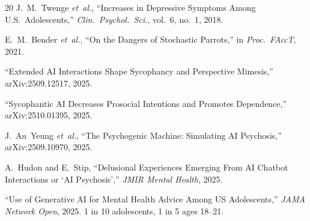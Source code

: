 \documentclass[conference]{IEEEtran}
\begin{document}
\begin{thebibliography}{20}
J.~M.~Twenge \textit{et~al.}, ``Increases in Depressive Symptoms Among U.S.\ Adolescents,'' \textit{Clin.\ Psychol.\ Sci.}, vol.~6, no.~1, 2018.

E.~M.~Bender \textit{et~al.}, ``On the Dangers of Stochastic Parrots,'' in \textit{Proc.\ FAccT}, 2021.

``Extended AI Interactions Shape Sycophancy and Perspective Mimesis,'' arXiv:2509.12517, 2025.

``Sycophantic AI Decreases Prosocial Intentions and Promotes Dependence,'' arXiv:2510.01395, 2025.

J.~Au~Yeung \textit{et~al.}, ``The Psychogenic Machine: Simulating AI Psychosis,'' arXiv:2509.10970, 2025.

A.~Hudon and E.~Stip, ``Delusional Experiences Emerging From AI Chatbot Interactions or `AI Psychosis','' \textit{JMIR Mental Health}, 2025.

``Use of Generative AI for Mental Health Advice Among US Adolescents,'' \textit{JAMA Network Open}, 2025. 1 in 10 adolescents, 1 in 5 ages 18--21.

\end{thebibliography}
\end{document}
